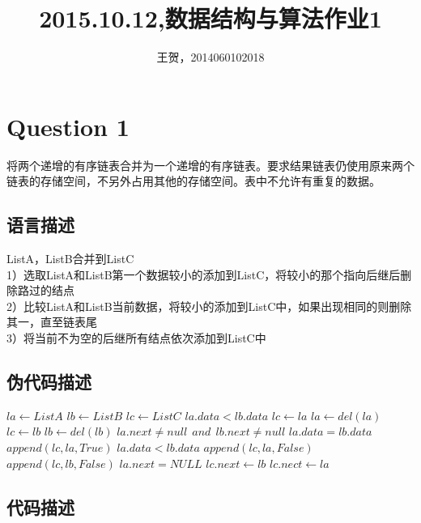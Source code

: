 \documentclass{article}
\author{王贺，2014060102018}
\title{2015.10.12,数据结构与算法作业1}
\begin{document}
	\maketitle
\section{Question 1} 

将两个递增的有序链表合并为一个递增的有序链表。要求结果链表仍使用原来两个链表的存储空间，不另外占用其他的存储空间。表中不允许有重复的数据。

\subsection{语言描述} 

ListA，ListB合并到ListC\\

1）选取ListA和ListB第一个数据较小的添加到ListC，将较小的那个指向后继后删除路过的结点\\

2）比较ListA和ListB当前数据，将较小的添加到ListC中，如果出现相同的则删除其一，直至链表尾\\

3）将当前不为空的后继所有结点依次添加到ListC中\\

\subsection{伪代码描述}



\begin{codebox}
\li $la \gets ListA$
\li $lb \gets ListB$
\li $lc \gets ListC$
\li \If  $la.data < lb.data$				 
\li 	\Then
\li			$lc \gets la$
\li 		$la \gets del(la)$
\li 	\Else
\li     	$lc \gets lb$
\li 		$lb \gets del(lb)$
	    \End
\li \While $la.next \neq null\ \  and\ \  lb.next \neq null $  
\li 	\Do
\li	 	\If $ la.data = lb.data $  
\li 		\Then 
\li 			$ append(lc, la, True) $
\li 		\Else
\li 			\If $ la.data < lb.data $
\li					\Then
\li 					$ append(lc, la, False) $
\li 				\Else
\li 					 $ append(lc, lb, False) $
	 			\End
	  	\End
	 	\End
\li  	\If $ la.next = NULL $
\li 		\Then 
\li  			$ lc.next \gets lb $
\li 		\Else
\li			$ lc.nect \gets la $
	 	\End
		

\end{codebox}



\subsection{代码描述}
\end{document}
